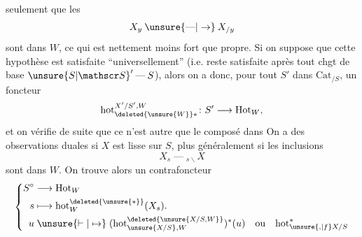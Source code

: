 
seulement que les
\[
X_y\mathbin{\unsure{\text{---}|\to}}X_{/y}
\]
sont dans $W$, ce qui est nettement moins fort que propre. Si on suppose que cette hypothèse est
satisfaite ``universellement'' (i.e. reste satisfaite après tout chgt de base $\unsure{S|\mathscr S}'\mathbin{\text{---}}S$), alors on a donc, pour tout $S'$ dans $\mathrm{Cat}_{/S}$, un  foncteur
\[
\mathrm{hot}^{X'/S',W}_{\deleted{\unsure{W}}*}\colon S'\longrightarrow\mathrm{Hot}_W,
\]
et on vérifie  de suite que ce n'est autre que le composé dans
On a des observations duales si $X$ est lisse sur $S$, plus généralement si les inclusions
\[
X_s\mathbin{\text{---}}{}_{s\backslash}X
\]
sont dans $W$. On trouve alors un contrafoncteur
\[
\left\{\begin{aligned}
S^\circ&\longrightarrow \mathrm{Hot}_W\\
s&\longmapsto\mathrm{hot}_W^{\deleted{\unsure{*}}}(X_s).\\
u&\mathrel{\unsure{\vdash|\mapsto}}(\mathrm{hot}^{\deleted{\unsure{X/S,W}}}_{\unsure{X/S},W})^*(u)\quad\text{ou}\quad\mathrm{hot}_{\unsure{,|f}X/S}^{*}
\end{aligned}\right.
\]


